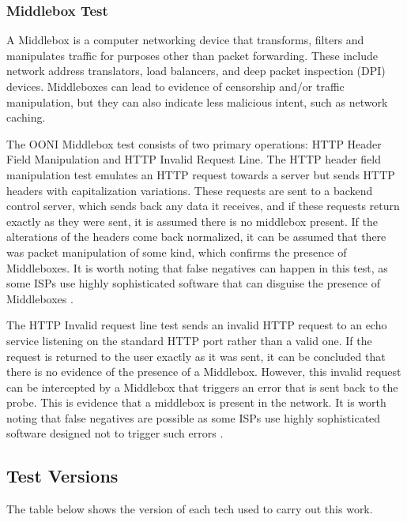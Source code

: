\subsubsection{Middlebox Test}

A Middlebox is a computer networking device that transforms, filters and manipulates traffic for purposes other than packet forwarding. These include network address translators, load balancers, and deep packet inspection (DPI) devices. Middleboxes can lead to evidence of censorship and/or traffic manipulation, but they can also indicate less malicious intent, such as network caching.

The OONI Middlebox test consists of two primary operations: HTTP Header Field Manipulation and HTTP Invalid Request Line. The HTTP header field manipulation test emulates an HTTP request towards a server but sends HTTP headers with capitalization variations. These requests are sent to a backend control server, which sends back any data it receives, and if these requests return exactly as they were sent, it is assumed there is no middlebox present. If the alterations of the headers come back normalized, it can be assumed that there was packet manipulation of some kind, which confirms the presence of Middleboxes. It is worth noting that false negatives can happen in this test, as some ISPs use highly sophisticated software that can disguise the presence of Middleboxes \cite{ooniHTTPHeader}.  

The HTTP Invalid request line test sends an invalid HTTP request to an echo service listening on the standard HTTP port rather than a valid one. If the request is returned to the user exactly as it was sent, it can be concluded that there is no evidence of the presence of a Middlebox. However, this invalid request can be intercepted by a Middlebox that triggers an error that is sent back to the probe. This is evidence that a middlebox is present in the network. It is worth noting that false negatives are possible as some ISPs use highly sophisticated software designed not to trigger such errors \cite{ooniHTTPInvalid}.

\subsection{Test Versions}

The table below shows the version of each tech used to carry out this work.

\vspace{1.5em}

